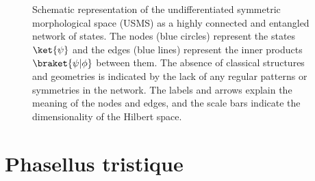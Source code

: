 \begin{figure}[h]
    \centering
    \caption{Schematic representation of the undifferentiated symmetric morphological space (USMS) as a highly connected and entangled network of states. The nodes (blue circles) represent the states $\ket{\psi}$ and the edges (blue lines) represent the inner products $\braket{\psi|\phi}$ between them. The absence of classical structures and geometries is indicated by the lack of any regular patterns or symmetries in the network. The labels and arrows explain the meaning of the nodes and edges, and the scale bars indicate the dimensionality of the Hilbert space.}
    \label{fig:usms}
\end{figure}\section{Phasellus tristique} \label{sec:phasellus-tristique}